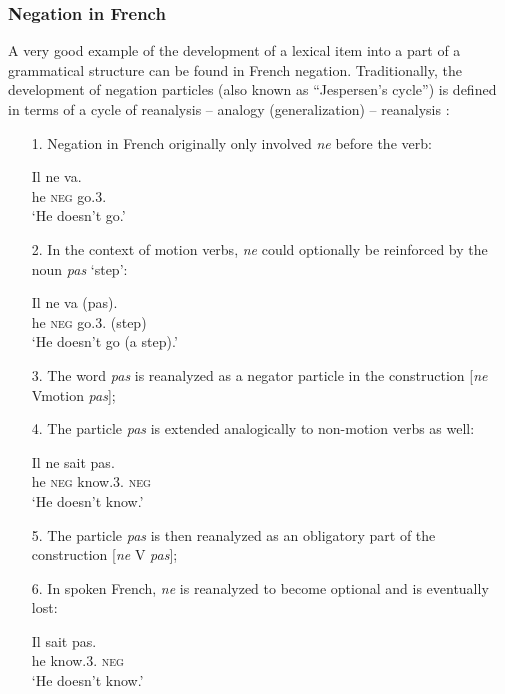 \subsubsection{Negation in French} 
A very good example of the development of a lexical item into a part of a grammatical structure can be found in French negation. Traditionally, the development of negation particles (also known as ``Jespersen's cycle'') is defined in terms of a cycle of reanalysis -- analogy (generalization) -- reanalysis \cite[65--66]{hopper93grammaticalization}:

\begin{enumerate}  \item[1.]   Negation in French originally only involved {\em ne} before the verb:
 



\ea
\gll Il ne va.\\
he {\textsc{neg}} go.3{\sg}.{\prs}\\
\glt `He doesn't go.'\\
\z

  \item[2.]   In the context of motion verbs, {\em ne} could optionally be reinforced by the noun {\em pas} `step':
 


\ea
\gll Il ne va (pas).\\
he {\textsc{neg}} go.3{\sg}.{\prs} (step)\\
\glt `He doesn't go (a step).'\\
\z

 \item[3.]  The word {\em pas} is reanalyzed as a negator particle in the construction [{\em ne} Vmotion {\em pas}];
 

  \item[4.]   The particle {\em pas} is extended analogically to non-motion verbs as well:
 

 

\ea
\gll Il ne sait pas.\\
he {\textsc{neg}} know.3{\sg}.{\prs} {\textsc{neg}}\\
\glt `He doesn't know.'\\
\z


   \item[5.]  The particle {\em pas} is then reanalyzed as an obligatory part of the construction [{\em ne} V {\em pas}];
 

 \item[6.]  In spoken French, {\em ne} is reanalyzed to become optional and is eventually lost:

\ea
\gll Il sait pas.\\
he know.3{\sg}.{\prs} {\textsc{neg}}\\
\glt `He doesn't know.'\\
\z 

\end{enumerate}
 

